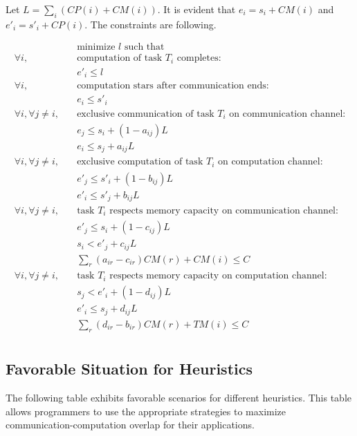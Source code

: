 \documentclass[runningheads]{llncs} %
\begin{document}
\noindent Let $L=\sum_i (CP(i) + CM(i))$. It is evident that $e_i =s_i + CM(i)$ and $e'_i =s'_i + CP(i)$. The constraints are following.

\vspace*{-0.5cm}
\begin{align*}
& \text{minimize } l \text{ such that }\\
\forall i, \quad & \text{computation of task } T_i \text{ completes:}\\
& e'_i \leq l\\
\forall i, \quad & \text{computation stars after communication ends:}\\
& e_i \leq s'_i\\
\forall i, \forall j\ne i, \quad & \text{exclusive communication of task }T_i \text{ on communication channel:}\\
& e_j \leq s_i +(1-a_{ij})L\\
& e_i\leq s_j +a_{ij}L\\
\forall i, \forall j\ne i, \quad & \text{exclusive computation of task }T_i \text{ on computation channel:}\\
& e'_j \leq s'_i +(1-b_{ij})L\\
& e'_i\leq s'_j +b_{ij}L\\
\forall i, \forall j\ne i, \quad & \text{task }T_i \text{ respects memory capacity on communication channel:}\\
& e'_j \leq s_i +(1-c_{ij})L\\
& s_i< e'_j +c_{ij}L\\
& \sum_r (a_{ir} - c_{ir})CM(r) + CM(i) \le C\\
\forall i, \forall j\ne i, \quad & \text{task }T_i \text{ respects memory capacity on computation channel:}\\
& s_j < e'_i +(1-d_{ij})L\\
& e'_i\leq s_j +d_{ij}L\\
& \sum_r (d_{ir} - b_{ir})CM(r) + TM(i) \le C\\
\end{align*} 

\subsection{Favorable Situation for Heuristics}
\noindent The following table exhibits favorable scenarios for different heuristics. This table allows programmers to use the appropriate strategies to maximize communication-computation overlap for their applications.
\end{document}

